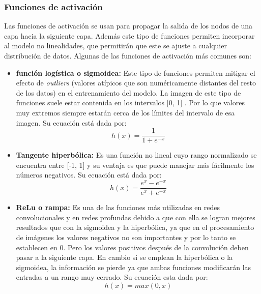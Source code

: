 \subsubsection{Funciones de activación}
Las funciones de activación se usan para propagar la salida de los nodos de una capa hacia la siguiente capa. Además este tipo de funciones permiten incorporar al modelo no linealidades, que permitirán que este se ajuste a cualquier distribución de datos. Algunas de las funciones de activación más comunes son:
\begin{itemize}
    \item \textbf{función logística o sigmoidea:} Este tipo de funciones permiten mitigar el efecto de \textit{outliers} (valores atípicos que son numéricamente distantes del resto de los datos) en el entrenamiento del modelo. La imagen de este tipo de funciones suele estar contenida en los intervalos [0, 1] \cite{sharma_2021}. Por lo que valores muy extremos siempre estarán cerca de los límites del intervalo de esa imagen. Su ecuación está dada por:
    \begin{equation}
        h(x) = \frac{1}{1 + e^{-x}}
    \end{equation}
    \item \textbf{Tangente hiperbólica:} Es una función no lineal cuyo rango normalizado se encuentra entre [-1, 1] y su ventaja es que puede manejar más fácilmente los números negativos. Su ecuación está dada por:
    \begin{equation}
        h(x) = \frac{e^{x} - e^{-x}}{e^{x} + e^{-x}}
    \end{equation}
    \item \textbf{ReLu o rampa:} Es una de las funciones más utilizadas en redes convolucionales y en redes profundas debido a que con ella se logran mejores resultados que con la sigmoidea y la hiperbólica, ya que en el procesamiento de imágenes los valores negativos no son importantes y por lo tanto se establecen en 0. Pero los valores positivos después de la convolución deben pasar a la siguiente capa. En cambio si se emplean la hiperbólica o la sigmoidea, la información se pierde ya que ambas funciones modificarán las entradas a un rango muy cerrado. Su ecuación esta dada por:
    \begin{equation}
        h(x) = max(0,x)
    \end{equation}
\end{itemize}
